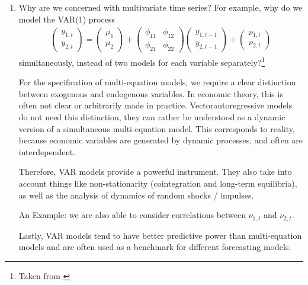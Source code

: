 \begin{enumerate}
    \item Why are we concerned with multivariate time series? For example, why do we model the VAR(1) process
          \begin{align*}
              \begin{pmatrix} y_{1,t} \\ y_{2,t} \end{pmatrix}
              = \begin{pmatrix} \mu_1 \\ \mu_2 \end{pmatrix}
              + \begin{pmatrix}
                    \phi_{11} & \phi_{12} \\
                    \phi_{21} & \phi_{22}
                \end{pmatrix}
              \begin{pmatrix} y_{1, {t-1}} \\ y_{2, {t-1}} \end{pmatrix}
              + \begin{pmatrix} \nu_{1, t} \\ \nu_{2, t} \end{pmatrix}
          \end{align*}
          simultaneously, instead of two models for each variable separately?\footnote{Taken from \cite[][see the section 16, titled ``Understanding multivariate time series concepts"]{Mutschler-2018-github_repo}}

          \begin{sol}
              For the specification of multi-equation models, we require a clear distinction between exogenous and endogenous variables. In economic theory, this is often not clear or arbitrarily made in practice. Vectorautoregressive models do not need this distinction, they can rather be understood as a dynamic version of a simultaneous multi-equation model. This corresponds to reality, because economic variables are generated by dynamic processes, and often are interdependent.

              Therefore, VAR models provide a powerful instrument. They also take into account things like non-stationarity (cointegration and long-term equilibria), as well as the analysis of dynamics of random shocks / impulses.

              An Example: we are also able to consider correlations between $\nu_{1, t}$ and $\nu_{2, t}$.

              Lastly, VAR models tend to have better predictive power than multi-equation models and are often used as a benchmark for different forecasting models.
          \end{sol}


\end{enumerate}
